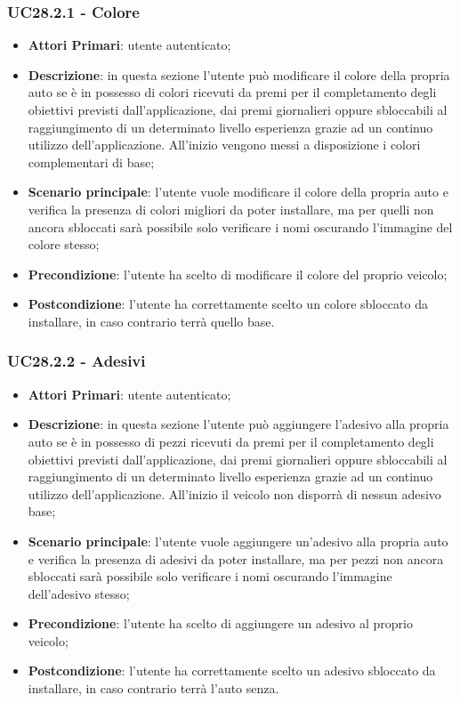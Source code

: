 \subsubsection{UC28.2.1 - Colore}
\begin{itemize}
	\item \textbf{Attori Primari}: utente autenticato;
	\item \textbf{Descrizione}: in questa sezione l'utente può modificare il colore della propria auto se è in possesso di colori ricevuti da premi per il completamento degli obiettivi previsti dall'applicazione, dai premi giornalieri oppure sbloccabili al raggiungimento di un determinato livello esperienza grazie ad un continuo utilizzo dell'applicazione.
	All'inizio vengono messi a disposizione i colori complementari di base;
	\item \textbf{Scenario principale}: l'utente vuole modificare il colore della propria auto e verifica la presenza di colori migliori da poter installare, ma per quelli non ancora sbloccati sarà possibile solo verificare i nomi oscurando l'immagine del colore stesso;
	\item \textbf{Precondizione}: l'utente ha scelto di modificare il colore del proprio veicolo; 
	\item \textbf{Postcondizione}: l'utente ha correttamente scelto un colore sbloccato da installare, in caso contrario terrà quello base.
\end{itemize}
\subsubsection{UC28.2.2 - Adesivi}
\begin{itemize}
	\item \textbf{Attori Primari}: utente autenticato;
	\item \textbf{Descrizione}: in questa sezione l'utente può aggiungere l'adesivo alla propria auto se è in possesso di pezzi ricevuti da premi per il completamento degli obiettivi previsti dall'applicazione, dai premi giornalieri oppure sbloccabili al raggiungimento di un determinato livello esperienza grazie ad un continuo utilizzo dell'applicazione.
	All'inizio il veicolo non disporrà di nessun adesivo base;
	\item \textbf{Scenario principale}: l'utente vuole aggiungere un'adesivo alla propria auto e verifica la presenza di adesivi da poter installare, ma per pezzi non ancora sbloccati sarà possibile solo verificare i nomi oscurando l'immagine dell'adesivo stesso;
	\item \textbf{Precondizione}: l'utente ha scelto di aggiungere un adesivo al proprio veicolo; 
	\item \textbf{Postcondizione}: l'utente ha correttamente scelto un adesivo sbloccato da installare, in caso contrario terrà l'auto senza.
\end{itemize}
